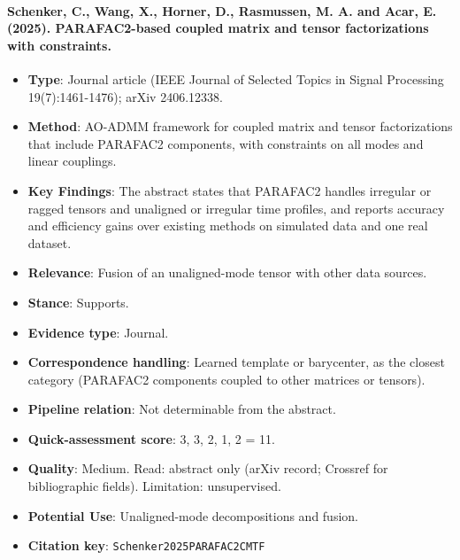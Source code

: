 \documentclass[journal,onecolumn]{IEEEtran}
\begin{document}
\paragraph{Schenker, C., Wang, X., Horner, D., Rasmussen, M. A. and Acar, E. (2025). PARAFAC2-based coupled matrix and tensor factorizations with constraints.~\cite{Schenker2025PARAFAC2CMTF}}\mbox{}

\begin{itemize}

\item{} \textbf{Type}: Journal article (IEEE Journal of Selected Topics in Signal Processing 19(7):1461-1476); arXiv 2406.12338.

\item{} \textbf{Method}: AO-ADMM framework for coupled matrix and tensor factorizations that include PARAFAC2 components, with constraints on all modes and linear couplings.

\item{} \textbf{Key Findings}: The abstract states that PARAFAC2 handles irregular or ragged tensors and unaligned or irregular time profiles, and reports accuracy and efficiency gains over existing methods on simulated data and one real dataset.

\item{} \textbf{Relevance}: Fusion of an unaligned-mode tensor with other data sources.

\item{} \textbf{Stance}: Supports.

\item{} \textbf{Evidence type}: Journal.

\item{} \textbf{Correspondence handling}: Learned template or barycenter, as the closest category (PARAFAC2 components coupled to other matrices or tensors).

\item{} \textbf{Pipeline relation}: Not determinable from the abstract.

\item{} \textbf{Quick-assessment score}: 3, 3, 2, 1, 2 = 11.

\item{} \textbf{Quality}: Medium. Read: abstract only (arXiv record; Crossref for bibliographic fields). Limitation: unsupervised.

\item{} \textbf{Potential Use}: Unaligned-mode decompositions and fusion.

\item{} \textbf{Citation key}: \texttt{Schenker2025PARAFAC2CMTF}

\end{itemize}
\end{document}
